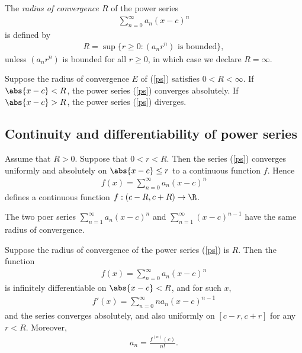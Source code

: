 \documentclass{article}
\begin{document}
\begin{definition}[Notes 3.1]
    The \emph{radius of convergence $R$} of the power series
    \begin{align}
        \label{ps}
        \sum_{n=0}^\infty a_n(x-c)^n
    \end{align}
    is defined by
    \begin{align*}
        R = \sup\{r\geq 0:(a_nr^n) \text{ is bounded}\},
    \end{align*}
    unless $(a_nr^n)$ is bounded for all $r\geq 0$, in which case we declare $R=\infty$.
\end{definition}

\begin{theorem}[Notes 3.1]
    Suppose the radius of convergence $E$ of (\ref{ps}) satisfies $0<R<\infty$.
    If $\abs{x-c}<R$, the power series (\ref{ps}) converges absolutely. If
    $\abs{x-c}>R$, the power series (\ref{ps}) diverges.
\end{theorem}

\subsection{Continuity and differentiability of power series}

\begin{theorem}[Notes 3.2]
    Assume that $R>0$. Suppose that $0<r<R$. Then the series (\ref{ps}) converges
    uniformly and absolutely on $\abs{x-c}\leq r$ to a continuous function $f$.
    Hence
    \begin{align*}
        f(x) = \sum_{n=0}^\infty a_n(x-c)^n
    \end{align*}
    defines a continuous function $f:(c-R, c+R)\to\R$.
\end{theorem}

\begin{lemma}[Notes 3.1]
    The two poer series $\sum_{n=1}^\infty a_n(x-c)^n$ and $\sum_{n=1}^\infty (x-c)^{n-1}$
    have the same radius of convergence.
\end{lemma}

\begin{theorem}[Notes 3.3]
    Suppose the radius of convergence of the power series (\ref{ps}) is $R$. Then
    the function
    \begin{align*}
        f(x) = \sum_{n=0}^\infty a_n(x-c)^n
    \end{align*}
    is infinitely differentiable on $\abs{x-c} < R$, and for such $x$,
    \begin{align*}
        f'(x) = \sum_{n=0}^\infty na_n(x-c)^{n-1}
    \end{align*}
    and the series converges absolutely, and also uniformly on $[c-r, c+r]$ for any
    $r<R$. Moreover,
    \begin{align*}
        a_n = \frac{f^{(n)}(c)}{n!}.
    \end{align*}
\end{theorem}
\end{document}
